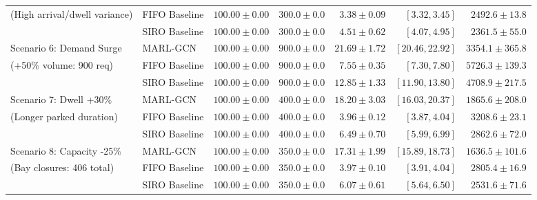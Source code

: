 \documentclass[journal]{IEEEtran}
\begin{document}
\begin{table}[t]
\begin{tabular}{llrrrrr}
(High arrival/dwell variance) & FIFO Baseline & $100.00 \pm 0.00$ & $300.0 \pm 0.0$ & $3.38 \pm 0.09$ & $[3.32, 3.45]$ & $2492.6 \pm 13.8$ \\
& SIRO Baseline & $100.00 \pm 0.00$ & $300.0 \pm 0.0$ & $4.51 \pm 0.62$ & $[4.07, 4.95]$ & $2361.5 \pm 55.0$ \\
\midrule
Scenario 6: Demand Surge & MARL-GCN & $100.00 \pm 0.00$ & $900.0 \pm 0.0$ & $21.69 \pm 1.72$ & $[20.46, 22.92]$ & $3354.1 \pm 365.8$ \\
(+50\% volume: 900 req) & FIFO Baseline & $100.00 \pm 0.00$ & $900.0 \pm 0.0$ & $7.55 \pm 0.35$ & $[7.30, 7.80]$ & $5726.3 \pm 139.3$ \\
& SIRO Baseline & $100.00 \pm 0.00$ & $900.0 \pm 0.0$ & $12.85 \pm 1.33$ & $[11.90, 13.80]$ & $4708.9 \pm 217.5$ \\
\midrule
Scenario 7: Dwell +30\% & MARL-GCN & $100.00 \pm 0.00$ & $400.0 \pm 0.0$ & $18.20 \pm 3.03$ & $[16.03, 20.37]$ & $1865.6 \pm 208.0$ \\
(Longer parked duration) & FIFO Baseline & $100.00 \pm 0.00$ & $400.0 \pm 0.0$ & $3.96 \pm 0.12$ & $[3.87, 4.04]$ & $3208.6 \pm 23.1$ \\
& SIRO Baseline & $100.00 \pm 0.00$ & $400.0 \pm 0.0$ & $6.49 \pm 0.70$ & $[5.99, 6.99]$ & $2862.6 \pm 72.0$ \\
\midrule
Scenario 8: Capacity -25\% & MARL-GCN & $100.00 \pm 0.00$ & $350.0 \pm 0.0$ & $17.31 \pm 1.99$ & $[15.89, 18.73]$ & $1636.5 \pm 101.6$ \\
(Bay closures: 406 total) & FIFO Baseline & $100.00 \pm 0.00$ & $350.0 \pm 0.0$ & $3.97 \pm 0.10$ & $[3.91, 4.04]$ & $2805.4 \pm 16.9$ \\
& SIRO Baseline & $100.00 \pm 0.00$ & $350.0 \pm 0.0$ & $6.07 \pm 0.61$ & $[5.64, 6.50]$ & $2531.6 \pm 71.6$ \\
\bottomrule
\end{tabular}
\end{table}
\end{document}
